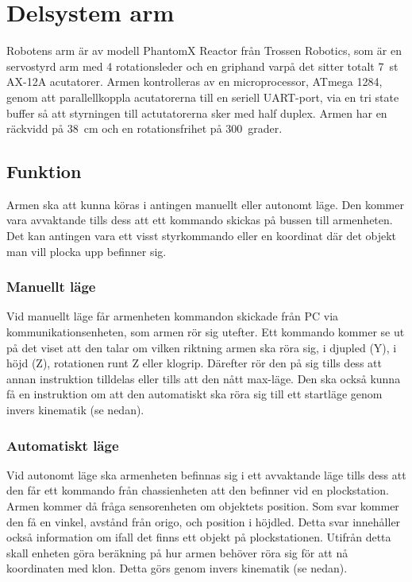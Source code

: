 

\section{Delsystem arm}

Robotens arm är av modell PhantomX Reactor från Trossen Robotics, som är en servostyrd arm med 4 rotationsleder och en griphand varpå det sitter totalt 7~st AX-12A acutatorer. Armen kontrolleras av en microprocessor, ATmega 1284, genom att parallellkoppla acutatorerna till en seriell UART-port, via en tri state buffer så att styrningen till actutatorerna sker med half duplex. Armen har en räckvidd på 38~cm och en rotationsfrihet på 300~grader. 


\subsection{Funktion}

Armen ska att kunna köras i antingen manuellt eller autonomt läge. Den kommer vara avvaktande tills dess att ett kommando skickas på bussen till armenheten. Det kan antingen vara ett visst styrkommando eller en koordinat där det objekt man vill plocka upp befinner sig.


\subsubsection{Manuellt läge} 

Vid manuellt läge får armenheten kommandon skickade från PC via kommunikationsenheten, som armen rör sig utefter. Ett kommando kommer se ut på det viset att den talar om vilken riktning armen ska röra sig, i djupled (Y), i höjd (Z), rotationen runt Z eller klogrip. Därefter rör den på sig tills dess att annan instruktion tilldelas eller tills att den nått max-läge. Den ska också kunna få en instruktion om att den automatiskt ska röra sig till ett startläge genom invers kinematik (se nedan). 

\subsubsection{Automatiskt läge}

Vid autonomt läge ska armenheten befinnas sig i ett avvaktande läge tills dess att den får ett kommando från chassienheten att den befinner vid en plockstation. Armen kommer då fråga sensorenheten om objektets position. Som svar kommer den få en vinkel, avstånd från origo, och position i höjdled. Detta svar innehåller också information om ifall det finns ett objekt på plockstationen. Utifrån detta skall enheten göra beräkning på hur armen behöver röra sig för att nå koordinaten med klon. Detta görs genom invers kinematik (se nedan).

